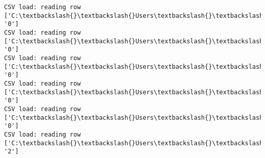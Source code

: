 \documentclass[11pt]{article}
\begin{document}
\begin{Verbatim}[commandchars=\\\{\}]
CSV load: reading row ['C:\textbackslash{}\textbackslash{}Users\textbackslash{}\textbackslash{}AbhishekGangadhar\textbackslash{}\textbackslash{}Downloads\textbackslash{}\textbackslash{}ActionRecog\textbackslash{}\textbackslash{}ActionRecog\textbackslash{}\textbackslash{}DataSets\textbackslash{}\textbackslash{}UCF11\textbackslash{}\textbackslash{}action\_youtube\_naudio\textbackslash{}\textbackslash{}biking\textbackslash{}\textbackslash{}v\_biking\_21\textbackslash{}\textbackslash{}v\_biking\_21\_08.avi', '0']
CSV load: reading row ['C:\textbackslash{}\textbackslash{}Users\textbackslash{}\textbackslash{}AbhishekGangadhar\textbackslash{}\textbackslash{}Downloads\textbackslash{}\textbackslash{}ActionRecog\textbackslash{}\textbackslash{}ActionRecog\textbackslash{}\textbackslash{}DataSets\textbackslash{}\textbackslash{}UCF11\textbackslash{}\textbackslash{}action\_youtube\_naudio\textbackslash{}\textbackslash{}biking\textbackslash{}\textbackslash{}v\_biking\_21\textbackslash{}\textbackslash{}v\_biking\_21\_09.avi', '0']
CSV load: reading row ['C:\textbackslash{}\textbackslash{}Users\textbackslash{}\textbackslash{}AbhishekGangadhar\textbackslash{}\textbackslash{}Downloads\textbackslash{}\textbackslash{}ActionRecog\textbackslash{}\textbackslash{}ActionRecog\textbackslash{}\textbackslash{}DataSets\textbackslash{}\textbackslash{}UCF11\textbackslash{}\textbackslash{}action\_youtube\_naudio\textbackslash{}\textbackslash{}biking\textbackslash{}\textbackslash{}v\_biking\_21\textbackslash{}\textbackslash{}v\_biking\_21\_10.avi', '0']
CSV load: reading row ['C:\textbackslash{}\textbackslash{}Users\textbackslash{}\textbackslash{}AbhishekGangadhar\textbackslash{}\textbackslash{}Downloads\textbackslash{}\textbackslash{}ActionRecog\textbackslash{}\textbackslash{}ActionRecog\textbackslash{}\textbackslash{}DataSets\textbackslash{}\textbackslash{}UCF11\textbackslash{}\textbackslash{}action\_youtube\_naudio\textbackslash{}\textbackslash{}biking\textbackslash{}\textbackslash{}v\_biking\_21\textbackslash{}\textbackslash{}v\_biking\_21\_11.avi', '0']
CSV load: reading row ['C:\textbackslash{}\textbackslash{}Users\textbackslash{}\textbackslash{}AbhishekGangadhar\textbackslash{}\textbackslash{}Downloads\textbackslash{}\textbackslash{}ActionRecog\textbackslash{}\textbackslash{}ActionRecog\textbackslash{}\textbackslash{}DataSets\textbackslash{}\textbackslash{}UCF11\textbackslash{}\textbackslash{}action\_youtube\_naudio\textbackslash{}\textbackslash{}biking\textbackslash{}\textbackslash{}v\_biking\_21\textbackslash{}\textbackslash{}v\_biking\_21\_12.avi', '0']
CSV load: reading row ['C:\textbackslash{}\textbackslash{}Users\textbackslash{}\textbackslash{}AbhishekGangadhar\textbackslash{}\textbackslash{}Downloads\textbackslash{}\textbackslash{}ActionRecog\textbackslash{}\textbackslash{}ActionRecog\textbackslash{}\textbackslash{}DataSets\textbackslash{}\textbackslash{}UCF11\textbackslash{}\textbackslash{}action\_youtube\_naudio\textbackslash{}\textbackslash{}trampoline\_jumping\textbackslash{}\textbackslash{}v\_jumping\_20\textbackslash{}\textbackslash{}v\_jumping\_20\_01.avi', '2']

\end{Verbatim}
\end{document}
